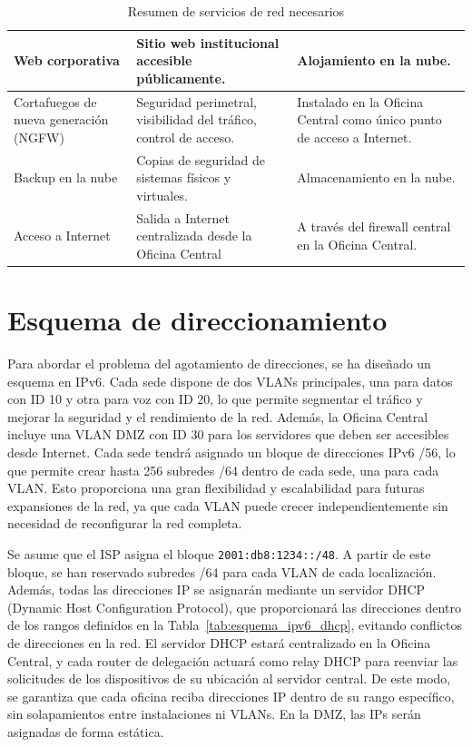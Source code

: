 \begin{table}[H]
{\begin{tabular}{|p{4cm}|p{6.5cm}|p{5.5cm}|}
			Web corporativa                        & Sitio web institucional accesible públicamente.                   & Alojamiento en la nube.                                                    \\ \hline
			Cortafuegos de nueva generación (NGFW) & Seguridad perimetral, visibilidad del tráfico, control de acceso. & Instalado en la Oficina Central como único punto de acceso a Internet.     \\ \hline
			Backup en la nube                      & Copias de seguridad de sistemas físicos y virtuales.              & Almacenamiento en la nube.                                                 \\ \hline
			Acceso a Internet                      & Salida a Internet centralizada desde la Oficina Central           & A través del firewall central en la Oficina Central.                       \\ \hline
		\end{tabular}
	}
	\caption{Resumen de servicios de red necesarios}
	\label{tab:servicios-red}
\end{table}

\section{Esquema de direccionamiento}
Para abordar el problema del agotamiento de direcciones, se ha diseñado un esquema en IPv6. Cada sede dispone de dos VLANs principales, una para datos con ID 10 y otra para voz con ID 20, lo que permite segmentar el tráfico y mejorar la seguridad y el rendimiento de la red. Además, la Oficina Central incluye una VLAN DMZ con ID 30 para los servidores que deben ser accesibles desde Internet. Cada sede tendrá asignado un bloque de direcciones IPv6 /56, lo que permite crear hasta 256 subredes /64 dentro de cada sede, una para cada VLAN. Esto proporciona una gran flexibilidad y escalabilidad para futuras expansiones de la red, ya que cada VLAN puede crecer independientemente sin necesidad de reconfigurar la red completa.

\vspace{0.5cm}
Se asume que el ISP asigna el bloque \texttt{2001:db8:1234::/48}. A partir de este bloque, se han reservado subredes /64 para cada VLAN de cada localización. Además, todas las direcciones IP se asignarán mediante un servidor DHCP (Dynamic Host Configuration Protocol), que proporcionará las direcciones dentro de los rangos definidos en la Tabla~\ref{tab:esquema_ipv6_dhcp}, evitando conflictos de direcciones en la red. El servidor DHCP estará centralizado en la Oficina Central, y cada router de delegación actuará como relay DHCP para reenviar las solicitudes de los dispositivos de su ubicación al servidor central. De este modo, se garantiza que cada oficina reciba direcciones IP dentro de su rango específico, sin solapamientos entre instalaciones ni VLANs. En la DMZ, las IPs serán asignadas de forma estática.

